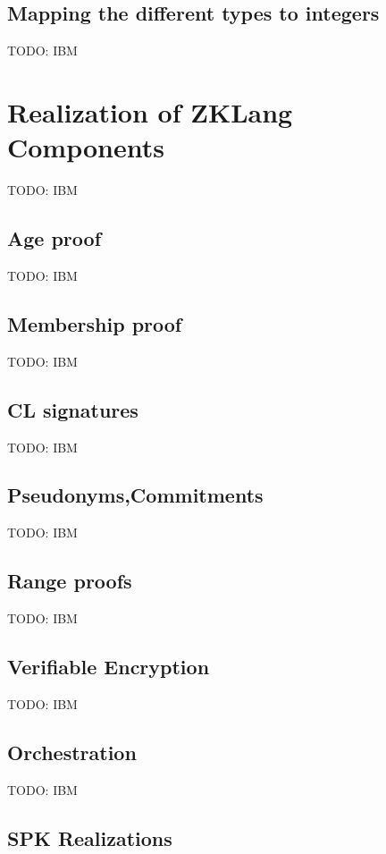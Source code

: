 \documentclass[a4paper]{article}
\begin{document}
\subsection{Mapping the different types to integers}
TODO: IBM


\section{Realization of ZKLang Components}
TODO: IBM



\subsection{Age proof}
TODO: IBM

\subsection{Membership proof}
TODO: IBM

\subsection{CL signatures}
TODO: IBM

\subsection{Pseudonyms,Commitments}
TODO: IBM

\subsection{Range proofs}
TODO: IBM

\subsection{Verifiable Encryption}
TODO: IBM

\subsection{Orchestration}
TODO: IBM

\newpage



\begin{appendix}

\section{SPK Realizations}






\end{appendix}
\end{document}
